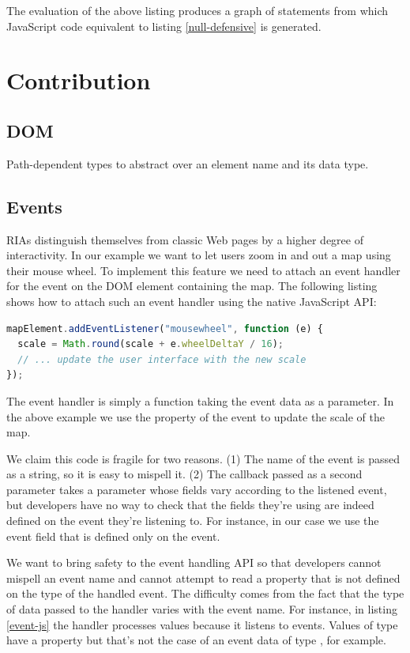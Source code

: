 \documentclass[runningheads,a4paper]{llncs}
\begin{document}
The evaluation of the above listing produces a graph of statements from which JavaScript code equivalent to
listing \ref{null-defensive} is generated.

\section{Contribution}

\subsection{DOM}

Path-dependent types to abstract over an element name and its data type.

\subsection{Events}

RIAs distinguish themselves from classic Web pages by a higher degree of interactivity. In our
example we want to let users zoom in and out a map using their mouse wheel. To implement this
feature we need to attach an event handler for the  event on the DOM element
containing the map. The following listing shows how to attach such an event handler using the native
JavaScript API:

\begin{lstlisting}[language=JavaScript,label=event-js,caption=Native JavaScript API to handle
events]
mapElement.addEventListener("mousewheel", function (e) {
  scale = Math.round(scale + e.wheelDeltaY / 16);
  // ... update the user interface with the new scale
});
\end{lstlisting}

The event handler is simply a function taking the event data as a parameter. In the above example we
use the  property of the event to update the scale of the map.

We claim this code is fragile for two reasons. (1) The name of the event is passed as a string, so
it is easy to mispell it. (2) The callback passed as a second parameter takes a parameter 
whose fields vary according to the listened event, but developers have no way to check that the
fields they’re using are indeed defined on the event they’re listening to. For instance, in our case
we use the  event field that is defined only on the  event.

We want to bring safety to the event handling API so that developers cannot mispell an event name
and cannot attempt to read a property that is not defined on the type of the handled event. The
difficulty comes from the fact that the type of data passed to the handler varies with the event
name. For instance, in listing \ref{event-js} the handler processes  values
because it listens to  events. Values of type  have a
property  but that’s not the case of an event data of type ,
for example.
\end{document}
